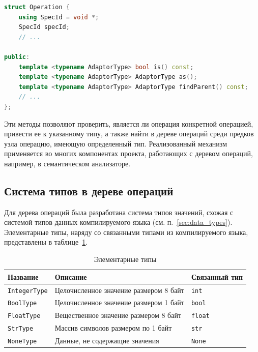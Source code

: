 \begin{lstlisting}[language=C++, caption=Интерфейс для доступа к RTTI]
struct Operation {
    using SpecId = void *;
    SpecId specId;
    // ...

public:
    template <typename AdaptorType> bool is() const;
    template <typename AdaptorType> AdaptorType as();
    template <typename AdaptorType> AdaptorType findParent() const;
    // ...
};
\end{lstlisting}

Эти методы позволяют проверить, является ли операция конкретной операцией, привести ее к указанному типу, а также найти в дереве операций среди предков узла операцию, имеющую определенный тип. Реализованный механизм применяется во многих компонентах проекта, работающих с деревом операций, например, в семантическом анализаторе.

\subsection{Система типов в дереве операций}
\label{sec:optree_types}

Для дерева операций была разработана система типов значений, схожая с системой типов данных компилируемого языка (см. п.~\ref{sec:data_types}).
Элементарные типы, наряду со связанными типами из компилируемого языка, представлены в таблице~\ref{tab:optree_basic_types}.

\begin{table}[h]
    \centering
    \caption{Элементарные типы}
    \label{tab:optree_basic_types}
    \begin{tabular}{lp{9cm}p{3cm}}
        \toprule
        \textbf{Название}  & \textbf{Описание}                      & \textbf{Связанный тип} \\
        \midrule
        \verb|IntegerType| & Целочисленное значение размером 8 байт & \verb|int|             \\
        \verb|BoolType|    & Целочисленное значение размером 1 байт & \verb|bool|            \\
        \verb|FloatType|   & Вещественное значение размером 8 байт  & \verb|float|           \\
        \verb|StrType|     & Массив символов размером по 1 байт     & \verb|str|             \\
        \verb|NoneType|    & Данные, не содержащие значения         & \verb|None|            \\
        \bottomrule
    \end{tabular}
\end{table}

